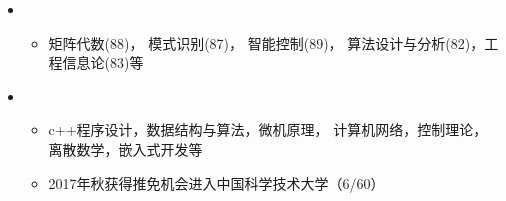  \begin{itemize}[leftmargin=*]
    \item
      {\small
      \begin{itemize}
        \item{矩阵代数(88)， 模式识别(87)， 智能控制(89)， 算法设计与分析(82)，工程信息论(83)等}
      \end{itemize}
      }
    \item
      {\small
      \begin{itemize}
        \item{c++程序设计，数据结构与算法，微机原理， 计算机网络，控制理论， 离散数学，嵌入式开发等}
        \\  
        \item 2017年秋获得推免机会进入中国科学技术大学（6/60）
      \end{itemize}
      }
  \end{itemize}